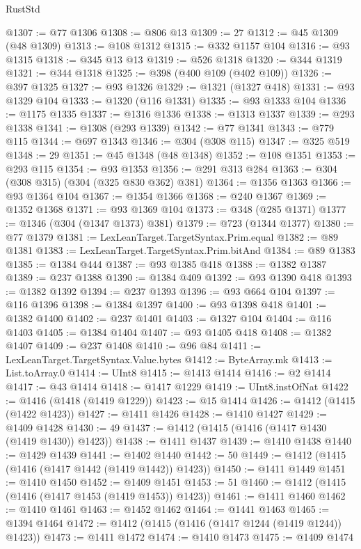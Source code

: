 \begin{lexlean}{RustStd}
\begin{coremodule}
@1307 := @77 @1306
@1308 := @806 @13
@1309 := 27
@1312 := @45 @1309 (@48 @1309)
@1313 := @108 @1312
@1315 := @332 @1157 @104
@1316 := @93 @1315
@1318 := @345 @13 @13
@1319 := @526 @1318
@1320 := @344 @1319
@1321 := @344 @1318
@1325 := @398 (@400 @109 (@402 @109))
@1326 := @397 @1325
@1327 := @93 @1326
@1329 := @1321 (@1327 @418)
@1331 := @93 @1329 @104
@1333 := @1320 (@116 @1331)
@1335 := @93 @1333 @104
@1336 := @1175 @1335
@1337 := @1316 @1336
@1338 := @1313 @1337
@1339 := @293 @1338
@1341 := @1308 (@293 @1339)
@1342 := @77 @1341
@1343 := @779 @115
@1344 := @697 @1343
@1346 := @304 (@308 @115)
@1347 := @325 @519
@1348 := 29
@1351 := @45 @1348 (@48 @1348)
@1352 := @108 @1351
@1353 := @293 @115
@1354 := @93 @1353
@1356 := @291 @313 @284
@1363 := @304 (@308 @315) (@304 (@325 @830 @362) @381)
@1364 := @1356 @1363
@1366 := @93 @1364 @104
@1367 := @1354 @1366
@1368 := @240 @1367
@1369 := @1352 @1368
@1371 := @93 @1369 @104
@1373 := @348 (@285 @1371)
@1377 := @1346 (@304 (@1347 @1373) @381)
@1379 := @723 (@1344 @1377)
@1380 := @77 @1379
@1381 := LexLeanTarget.TargetSyntax.Prim.equal
@1382 := @89 @1381
@1383 := LexLeanTarget.TargetSyntax.Prim.bitAnd
@1384 := @89 @1383
@1385 := @1384 @444
@1387 := @93 @1385 @418
@1388 := @1382 @1387
@1389 := @237 @1388
@1390 := @1384 @409
@1392 := @93 @1390 @418
@1393 := @1382 @1392
@1394 := @237 @1393
@1396 := @93 @664 @104
@1397 := @116 @1396
@1398 := @1384 @1397
@1400 := @93 @1398 @418
@1401 := @1382 @1400
@1402 := @237 @1401
@1403 := @1327 @104
@1404 := @116 @1403
@1405 := @1384 @1404
@1407 := @93 @1405 @418
@1408 := @1382 @1407
@1409 := @237 @1408
@1410 := @96 @84
@1411 := LexLeanTarget.TargetSyntax.Value.bytes
@1412 := ByteArray.mk
@1413 := List.toArray.{0}
@1414 := UInt8
@1415 := @1413 @1414
@1416 := @2 @1414
@1417 := @43 @1414
@1418 := @1417 @1229
@1419 := UInt8.instOfNat
@1422 := @1416 (@1418 (@1419 @1229))
@1423 := @15 @1414
@1426 := @1412 (@1415 (@1422 @1423))
@1427 := @1411 @1426
@1428 := @1410 @1427
@1429 := @1409 @1428
@1430 := 49
@1437 := @1412 (@1415 (@1416 (@1417 @1430 (@1419 @1430)) @1423))
@1438 := @1411 @1437
@1439 := @1410 @1438
@1440 := @1429 @1439
@1441 := @1402 @1440
@1442 := 50
@1449 := @1412 (@1415 (@1416 (@1417 @1442 (@1419 @1442)) @1423))
@1450 := @1411 @1449
@1451 := @1410 @1450
@1452 := @1409 @1451
@1453 := 51
@1460 := @1412 (@1415 (@1416 (@1417 @1453 (@1419 @1453)) @1423))
@1461 := @1411 @1460
@1462 := @1410 @1461
@1463 := @1452 @1462
@1464 := @1441 @1463
@1465 := @1394 @1464
@1472 := @1412 (@1415 (@1416 (@1417 @1244 (@1419 @1244)) @1423))
@1473 := @1411 @1472
@1474 := @1410 @1473
@1475 := @1409 @1474

\end{coremodule}
\end{lexlean}
